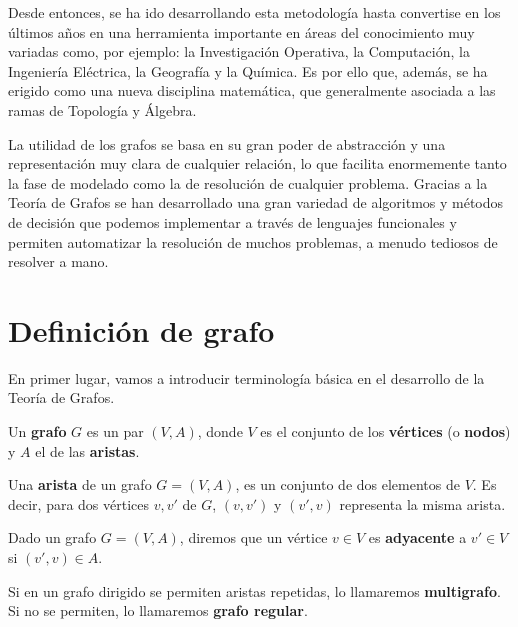 Desde entonces, se ha ido desarrollando esta metodología hasta convertise en
los últimos años en una herramienta importante en áreas del conocimiento muy
variadas como, por ejemplo: la Investigación Operativa, la Computación, la
Ingeniería Eléctrica, la Geografía y la Química. Es por ello que, además, se ha
erigido como una nueva disciplina matemática, que generalmente asociada a las
ramas de Topología y Álgebra.

La utilidad de los grafos se basa en su gran poder de abstracción y una
representación muy clara de cualquier relación, lo que facilita enormemente
tanto la fase de modelado como la de resolución de cualquier problema. Gracias
a la Teoría de Grafos se han desarrollado una gran variedad de algoritmos y
métodos de decisión que podemos implementar a través de lenguajes funcionales y
permiten automatizar la resolución de muchos problemas, a menudo tediosos de
resolver a mano.


\minitoc

\section{Definición de grafo}

En primer lugar, vamos a introducir terminología básica en el desarrollo de la Teoría de 
Grafos.

\begin{definicion}
  Un \textbf{grafo} $G$ es un par $(V,A)$, donde $V$ es el conjunto de los
  \textbf{vértices} (o \textbf{nodos}) y $A$ el de las \textbf{aristas}. 
\end{definicion}

\begin{definicion}
  Una \textbf{arista} de un grafo $G = (V,A)$, es un conjunto de dos elementos
  de $V$. Es decir, para dos vértices $v,v'$ de $G$, $(v,v')$ y $(v',v)$
  representa la misma arista.
\end{definicion}

\begin{definicion}
  Dado un grafo $G = (V,A)$, diremos que un vértice $v \in V$ es \textbf{adyacente}
  a $v' \in V$ si $(v',v) \in A$. 
\end{definicion}

\begin{definicion}
  Si en un grafo dirigido se permiten aristas repetidas, lo llamaremos 
  \textbf{multigrafo}. Si no se permiten, lo llamaremos \textbf{grafo regular}.
\end{definicion}


